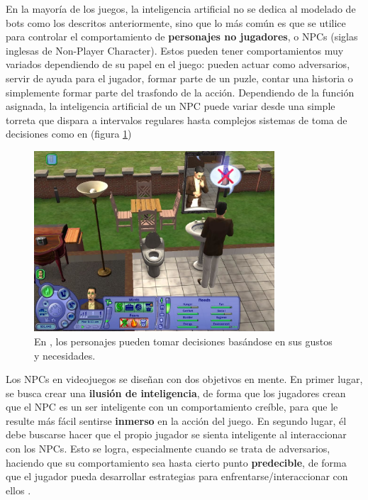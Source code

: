En la mayoría de los juegos, la inteligencia artificial no se dedica al modelado de bots como los descritos anteriormente, sino que lo más común es que se utilice para controlar el comportamiento de \textbf{personajes no jugadores}, o NPCs (siglas inglesas de Non-Player Character). Estos pueden tener comportamientos muy variados dependiendo de su papel en el juego: pueden actuar como adversarios, servir de ayuda para el jugador, formar parte de un puzle, contar una historia o simplemente formar parte del trasfondo de la acción. Dependiendo de la función asignada, la inteligencia artificial de un NPC puede variar desde una simple torreta que dispara a intervalos regulares hasta complejos sistemas de toma de decisiones como en  (figura \ref{sims-captura})
\begin{figure}[h]
	\includegraphics[width=0.8\textwidth]{images/estadodelarte/ai/sims-captura}
	\centering
	\caption{En , los personajes pueden tomar decisiones basándose en sus gustos y necesidades.}
	\label{sims-captura}
\end{figure}

Los NPCs en videojuegos se diseñan con dos objetivos en mente. En primer lugar, se busca crear una \textbf{ilusión de inteligencia}, de forma que los jugadores crean que el NPC es un ser inteligente con un comportamiento creíble, para que le resulte más fácil sentirse \textbf{inmerso} en la acción del juego. En segundo lugar, él debe buscarse hacer que el propio jugador se sienta inteligente al interaccionar con los NPCs. Esto se logra, especialmente cuando se trata de adversarios, haciendo que su comportamiento sea hasta cierto punto \textbf{predecible}, de forma que el jugador pueda desarrollar estrategias para enfrentarse/interaccionar con ellos \cite{ia_moderno}. 

